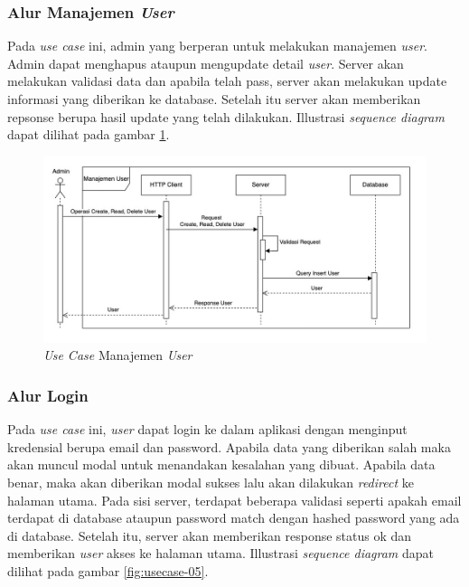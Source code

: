 \subsubsection{Alur Manajemen \textit{User}}

Pada \textit{use case} ini, admin yang berperan untuk melakukan manajemen \textit{user}. Admin dapat menghapus ataupun mengupdate detail \textit{user}. Server akan melakukan validasi data dan apabila telah pass, server akan melakukan update informasi yang diberikan ke database. Setelah itu server akan memberikan repsonse berupa hasil update yang telah dilakukan. Illustrasi \textit{sequence diagram} dapat dilihat pada gambar \ref{fig:usecase-04}.

\begin{figure}[ht]
  \centering
  \includegraphics[width=1\textwidth]{resources/chapter-3/usecase/uc-04.jpg}
  \caption{\textit{Use Case} Manajemen \textit{User}}
  \label{fig:usecase-04}
\end{figure}

\subsubsection{Alur Login}

Pada \textit{use case} ini, \textit{user} dapat login ke dalam aplikasi dengan menginput kredensial berupa email dan password. Apabila data yang diberikan salah maka akan muncul modal untuk menandakan kesalahan yang dibuat. Apabila data benar, maka akan diberikan modal sukses lalu akan dilakukan \textit{redirect} ke halaman utama. Pada sisi server, terdapat beberapa validasi seperti apakah email terdapat di database ataupun password match dengan hashed password yang ada di database. Setelah itu, server akan memberikan response status ok dan memberikan \textit{user} akses ke halaman utama. Illustrasi \textit{sequence diagram} dapat dilihat pada gambar \ref{fig:usecase-05}.

